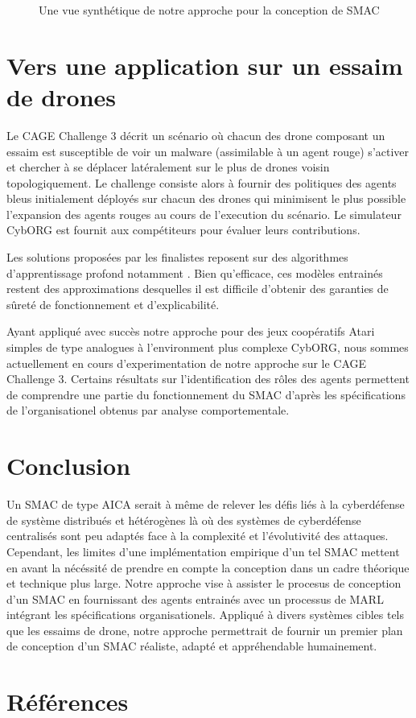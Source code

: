 \documentclass[conference]{IEEEtran}
\begin{document}
\begin{figure}[h]
    \centering
    
    \caption{Une vue synthétique de notre approche pour la conception de SMAC}
    \label{fig:design_approach}
\end{figure}

\section{Vers une application sur un essaim de drones}

Le CAGE Challenge 3\cite{cage_challenge_3_announcement2022} décrit un scénario où chacun des drone composant un essaim est susceptible de voir un malware (assimilable à un agent rouge) s'activer et chercher à se déplacer latéralement sur le plus de drones voisin topologiquement. Le challenge consiste alors à fournir des politiques des agents bleus initialement déployés sur chacun des drones qui minimisent le plus possible l'expansion des agents rouges au cours de l'execution du scénario. Le simulateur CybORG est fournit aux compétiteurs pour évaluer leurs contributions.

Les solutions proposées par les finalistes reposent sur des algorithmes d'apprentissage profond notamment . Bien qu'efficace, ces modèles entrainés restent des approximations desquelles il est difficile d'obtenir des garanties de sûreté de fonctionnement et d'explicabilité.

Ayant appliqué avec succès notre approche pour des jeux coopératifs Atari simples de type  analogues à l'environment plus complexe CybORG, nous sommes actuellement en cours d'experimentation de notre approche sur le CAGE Challenge 3. Certains résultats sur l'identification des rôles des agents permettent de comprendre une partie du fonctionnement du SMAC d'après les spécifications de l'organisationel obtenus par analyse comportementale.

\section{Conclusion}
Un SMAC de type AICA serait à même de relever les défis liés à la cyberdéfense de système distribués et hétérogènes là où des systèmes de cyberdéfense centralisés sont peu adaptés face à la complexité et l'évolutivité des attaques.
Cependant, les limites d'une implémentation empirique d'un tel SMAC mettent en avant la nécéssité de prendre en compte la conception dans un cadre théorique et technique plus large.
Notre approche vise à assister le procesus de conception d'un SMAC en fournissant des agents entrainés avec un processus de MARL intégrant les spécifications organisationels. Appliqué à divers systèmes cibles tels que les essaims de drone, notre approche permettrait de fournir un premier plan de conception d'un SMAC réaliste, adapté et appréhendable humainement.

\section*{Références}


%


\end{document}
